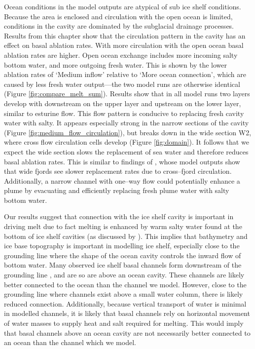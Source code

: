 Ocean conditions in the model outputs are atypical of sub ice shelf conditions. Because the area is enclosed and circulation with the open ocean is limited, conditions in the cavity are dominated by the subglacial drainage processes.
Results from this chapter show that the circulation pattern in the cavity has an effect on basal ablation rates. With more circulation with the open ocean basal ablation rates are higher. Open ocean exchange includes more incoming salty bottom water, and more outgoing fresh water. This is shown by the lower ablation rates of `Medium inflow' relative to `More ocean connection', which are caused by less fresh water output---the two model runs are otherwise identical (Figure \ref{fig:compare_melt_sum}).  Results show that in all model runs two layers develop with downstream on the upper layer and upstream on the lower layer,  similar to esturine flow. This flow pattern is conducive to replacing fresh cavity water with salty. It appears especially strong in the narrow sections of the cavity (Figure \ref{fig:medium_flow_circulation}), but breaks down in the wide section W2, where cross flow circulation cells develop (Figure \ref{fig:domain}). It follows that we expect the wide section slows the replacement of sea water and therefore reduces basal ablation rates. This is similar to findings of \cite{carroll2017subglacial}, whose model outputs show that wide fjords see slower replacement rates due to cross--fjord circulation. Additionally, a narrow channel with one--way flow could potentially enhance a plume by evacuating and efficiently replacing fresh plume water with salty bottom water.

Our results suggest that connection with the ice shelf cavity is important in driving melt due to fact melting is enhanced by warm salty water found at the bottom of ice shelf cavities  (as discussed by \cite{goldberg2019accurately}). This implies that bathymetry and ice base topography is important in modelling ice shelf, especially close to the grounding line where the shape of the ocean cavity controls the inward flow of bottom water. 
Many observed ice shelf basal channels form downstream of the grounding line \citep{alley2016impacts}, and are so are above an ocean cavity. These channels are likely better connected to the ocean than the channel we model. However, close to the grounding line where channels exist above a small water column, there is likely reduced connection. Additionally, because vertical transport of water is minimal in modelled channels, it is likely that basal channels rely on horizontal movement of water masses to supply heat and salt required for melting. This would imply that basal channels above an ocean cavity are not necessarily better connected to an ocean than the channel which we model. 

